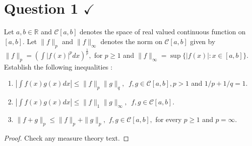 \section{Question 1 \texorpdfstring{$\checkmark$}{}}
\horz
Let $a,b\in\mathbb R$ and $\mathscr C[a,b]$ denotes the space of real valued continuous function on $[a,b].$ Let $\|f\|_p$ and $\|f\|_{\infty}$ denotes the norm on $\mathscr C[a,b]$ given by 
$\|f\|_p= (\int |f(x)|^p dx )^{\frac{1}{p}},$ for $p\geqslant 1$ and $\|f\|_{\infty}= \sup \{|f(x)| : x\in [a,b]\}.$ 
 Establish the following inequalities :

 \begin{enumerate}[label=(\roman*)]
\item $|\displaystyle \int f(x) g(x) dx| \leqslant \|f\|_p\|g\|_q, \,\,\,f,g\in \mathscr C[a,b], p > 1$ and $1/p +1/q =1.$ 
\item $|\displaystyle \int f(x) g(x) dx| \leqslant \|f\|_1\|g\|_{\infty}, \,\,\,f,g\in \mathscr C[a,b].$
\item $\|f+g\|_p \leqslant \|f\|_p + \|g\|_p,\,\, f,g\in \mathscr C[a,b],$ for every  $p\geqslant 1$ and $p=\infty.$
\end{enumerate}
\horz
\begin{proof}
    Check any measure theory text. \checkmark
\end{proof}
